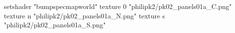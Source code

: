 setshader "bumpspecmapworld"
    texture 0 "philipk2/pk02_panels01a_C.png"
    texture n "philipk2/pk02_panels01a_N.png"
    texture s "philipk2/pk02_panels01a_S.png"